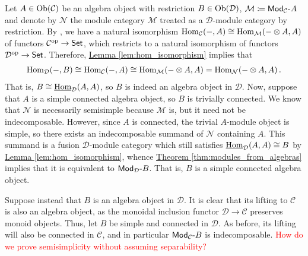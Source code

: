 \documentclass[12pt, reqno]{amsart}
\numberwithin{equation}{section}
\theoremstyle{plainspace}
\theoremstyle{definitionspace}
\theoremstyle{remarkspace}
\renewenvironment{proof}{{\noindent\textbf{Proof.}}}{\null\hfill\qedsymbol}
\newcommand{\mathcat}[1]{\mathcal{#1}}
\newcommand{\Ob}{\textup{Ob}}
\newcommand{\Hom}[2][]{
	\ifthenelse{\equal{#2}{}}
		{\textup{Hom}_{#1}}
		{\textup{Hom}_{#1}\!\left(#2\right)}
}
\newcommand{\IntHom}[2][]{
	\ifthenelse{\equal{#2}{}}
		{\underline{\textup{Hom}}_{#1}}
		{\underline{\textup{Hom}}_{#1}\!\left(#2\right)}
}
\newcommand{\opcat}[1]{{#1}^{\textup{op}}}
\newcommand{\textcat}[1]{\textup{\textsf{#1}}}
\newcommand{\rmodcat}[2][]{\textcat{Mod}_{#1}\textcat{-}#2}
\begin{document}
\begin{proof}
\noindent Let $A \in \Ob(\mathcat{C})$ be an algebra object with restriction $B \in \Ob(\mathcat{D})$, $\mathcat{M} \coloneqq \rmodcat[\mathcat{C}]{A}$ and denote by $\mathcat{N}$ the module category $\mathcat{M}$ treated as a $\mathcat{D}$-module category by restriction. By \cite[Lemma 7.8.12]{Etingof_2016}, we have a natural isomorphism $\Hom[\mathcat{C}]{-, A} \cong \Hom[\mathcat{M}]{- \otimes A, A}$ of functors $\opcat{\mathcat{C}} \to \textcat{Set}$, which restricts to a natural isomorphism of functors $\opcat{\mathcat{D}} \to \textcat{Set}$. Therefore, \hyperref[lem:hom_isomorphism]{Lemma \ref*{lem:hom_isomorphism}} implies that
\begin{align*}
\begin{split}
\Hom[\mathcat{D}]{-, B} \cong \Hom[\mathcat{C}]{-, A} \cong \Hom[\mathcat{M}]{- \otimes A, A} = \Hom[\mathcat{N}]{- \otimes A, A}.
\end{split}
\end{align*}
\noindent That is, $B \cong \IntHom[\mathcat{D}]{A, A}$, so $B$ is indeed an algebra object in $\mathcat{D}$. Now, suppose that $A$ is a simple connected algebra object, so $B$ is trivially connected. We know that $\mathcat{N}$ is necessarily semisimple because $\mathcat{M}$ is, but it need not be indecomposable. However, since $A$ is connected, the trivial $A$-module object is simple, so there exists an indecomposable summand of $\mathcat{N}$ containing $A$. This summand is a fusion $\mathcat{D}$-module category which still satisfies $\IntHom[\mathcat{D}]{A, A} \cong B$ by \hyperref[lem:hom_isomorphism]{Lemma \ref*{lem:hom_isomorphism}}, whence \hyperref[thm:modules_from_algebras]{Theorem \ref*{thm:modules_from_algebras}} implies that it is equivalent to $\rmodcat[\mathcat{D}]{B}$. That is, $B$ is a simple connected algebra object.
\newline

\noindent Suppose instead that $B$ is an algebra object in $\mathcat{D}$. It is clear that its lifting to $\mathcat{C}$ is also an algebra object, as the monoidal inclusion functor $\mathcat{D} \to \mathcat{C}$ preserves monoid objects. Thus, let $B$ be simple and connected in $\mathcat{D}$. As before, its lifting will also be connected in $\mathcat{C}$, and in particular $\rmodcat[\mathcat{C}]{B}$ is indecomposable. \textcolor{red}{How do we prove semisimplicity without assuming separability?}
\end{proof}
\newline
\end{document}
